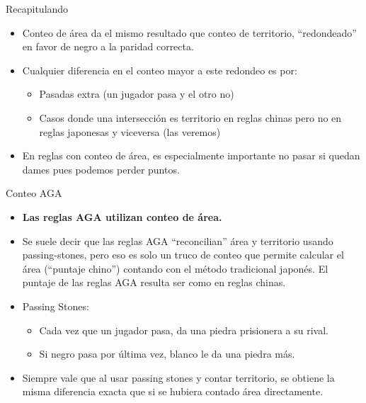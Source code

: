 \documentclass{beamer}
\begin{document}
\begin{frame}{Recapitulando}

    \begin{itemize}
        \item Conteo de área da el mismo resultado que conteo de territorio, ``redondeado'' en favor de negro a la paridad correcta.
        \item Cualquier diferencia en el conteo mayor a este redondeo es por:
           \begin{itemize}
              \item Pasadas extra (un jugador pasa y el otro no)
              \item Casos donde una intersección es territorio en reglas chinas pero no en reglas japonesas y viceversa (las veremos)
           \end{itemize}
        \item En reglas con conteo de área, es especialmente importante no pasar si quedan dames pues podemos perder puntos.
    \end{itemize}
  
\end{frame}

\begin{frame}{Conteo AGA}

    \begin{itemize}
        \item \textbf{Las reglas AGA utilizan conteo de área.}
        \item Se suele decir que las reglas AGA ``reconcilian'' área y territorio usando passing-stones, pero eso es solo un truco de conteo que permite
          calcular el área (``puntaje chino'') contando con el método tradicional japonés. El puntaje de las reglas AGA resulta ser como en reglas chinas.
        \item Passing Stones: 
          \begin{itemize}
             \item Cada vez que un jugador pasa, da una piedra prisionera a su rival.
             \item Si negro pasa por última vez, blanco le da una piedra más.
          \end{itemize}
        \item Siempre vale que al usar passing stones y contar territorio, se obtiene la misma diferencia exacta que si se hubiera contado área directamente.
    \end{itemize}
  
\end{frame}
\end{document}
